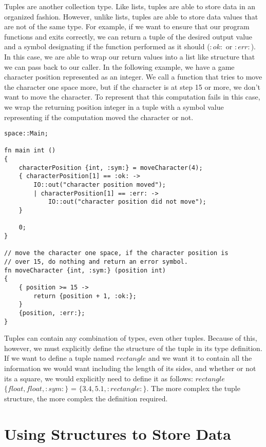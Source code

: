 \documentclass{article}
\begin{document}
Tuples are another collection type. Like lists, tuples are able to store data in an organized fashion. However, unlike lists, tuples are able to store data values that are
not of the same type. For example, if we want to ensure that our program functions and exits correctly, we can return a tuple of the desired output value and a symbol designating
if the function performed as it should ($:ok:$ or $:err:$). In this case, we are able to wrap our return values into a list like structure that we can pass back to our caller. In
the following example, we have a game character position represented as an integer. We call a function that tries to move the character one space more, but if the character is
at step 15 or more, we don't want to move the character. To represent that this computation fails in this case, we wrap the returning position integer in a tuple with a symbol
value representing if the computation moved the character or not.

\begin{lstlisting}
space::Main;

fn main int ()
{
	characterPosition {int, :sym:} = moveCharacter(4);
 	{ characterPosition[1] == :ok: ->
  		IO::out("character position moved");
    	| characterPosition[1] == :err: ->
     		IO::out("character position did not move");
	}

	0;
}

// move the character one space, if the character position is
// over 15, do nothing and return an error symbol.
fn moveCharacter {int, :sym:} (position int)
{
	{ position >= 15 ->
 		return {position + 1, :ok:};
	}
 	{position, :err:};
}
\end{lstlisting}

Tuples can contain any combination of types, even other tuples. Because of this, however, we must explicitly define the structure of the tuple in its type definition. If
we want to define a tuple named $rectangle$ and we want it to contain all the information we would want including the length of its sides, and whether or not its a square,
we would explicitly need to define it as follows: $rectangle$ $\{float, float, :sym:\}$ = $\{3.4, 5.1, :rectangle:\}$. The more complex the tuple structure, the more complex the
definition required.


\section{Using Structures to Store Data}
\end{document}
